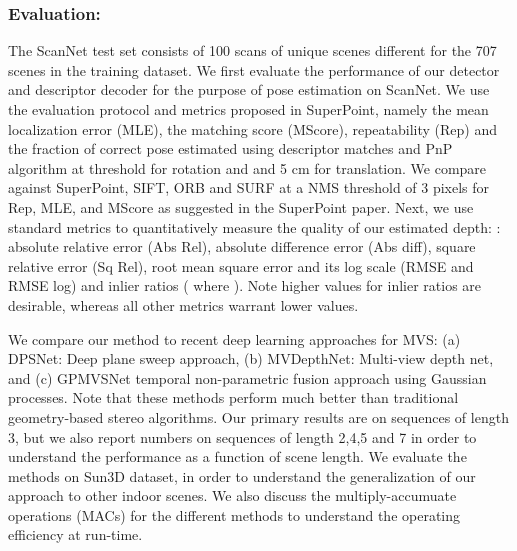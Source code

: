 \documentclass[runningheads]{llncs}
\begin{document}
\subsubsection{Evaluation:} The ScanNet test set consists of 100 scans of unique scenes different for the 707 scenes in the training dataset. We first evaluate the performance of our detector and descriptor decoder for the purpose of pose estimation on ScanNet. We use the evaluation protocol and metrics proposed in SuperPoint, namely the mean localization error (MLE), the matching score (MScore), repeatability (Rep) and the fraction of correct pose estimated using descriptor matches and PnP algorithm at  threshold for rotation and and 5 cm for translation. We compare against SuperPoint, SIFT, ORB and SURF at a NMS threshold of 3 pixels for Rep, MLE, and MScore as suggested in the SuperPoint paper.
Next, we use standard metrics to quantitatively measure the quality of our estimated depth: : absolute relative error (Abs Rel), absolute difference error (Abs diff), square relative error (Sq Rel), root mean square error and its log scale (RMSE and RMSE log) and inlier ratios ( where ). Note higher values for inlier ratios are desirable, whereas all other metrics warrant lower values. 

We compare our method to recent deep learning approaches for MVS: (a) DPSNet: Deep plane sweep approach, (b) MVDepthNet: Multi-view depth net, and (c) GPMVSNet temporal non-parametric fusion approach using Gaussian processes. Note that these methods perform much better than traditional geometry-based stereo algorithms. Our primary results are on sequences of length 3, but we also report numbers on sequences of length 2,4,5 and 7 in order to understand the performance as a function of scene length. We evaluate the methods on Sun3D dataset, in order to understand the generalization of our approach to other indoor scenes. We also discuss the multiply-accumuate operations (MACs) for the different methods to understand the operating efficiency at run-time. 
\end{document}
